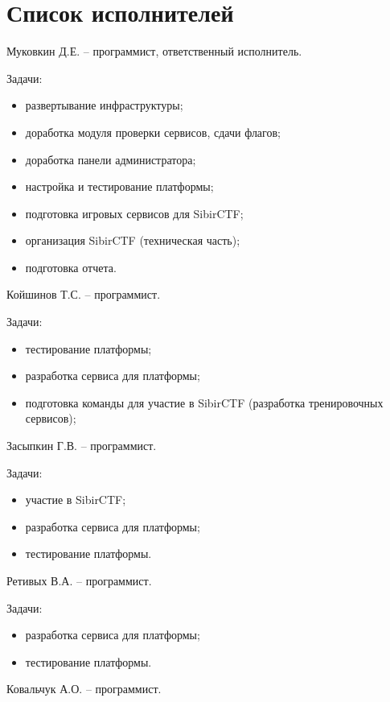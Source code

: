 


 
 
 
 \newpage
 \section*{Список исполнителей}

Муковкин Д.Е. -- программист, ответственный исполнитель.

Задачи:
\begin{itemize}
\item развертывание инфраструктуры;
\item доработка модуля проверки сервисов, сдачи флагов;
\item доработка панели администратора;
\item настройка и тестирование платформы;
\item подготовка игровых сервисов для SibirCTF;
\item организация SibirCTF (техническая часть);
\item подготовка отчета.
\end{itemize}

Койшинов Т.С. -- программист.

Задачи:
\begin{itemize}
\item тестирование платформы;
\item разработка сервиса для платформы;
\item подготовка команды для участие в SibirCTF (разработка тренировочных сервисов);
\end{itemize}

Засыпкин Г.В. -- программист.

Задачи:
\begin{itemize}
\item участие в SibirCTF;
\item разработка сервиса для платформы;
\item тестирование платформы.
\end{itemize}

Ретивых В.А. -- программист.

Задачи:
\begin{itemize}
\item разработка сервиса для платформы;
\item тестирование платформы.
\end{itemize}

Ковальчук А.О. -- программист.

